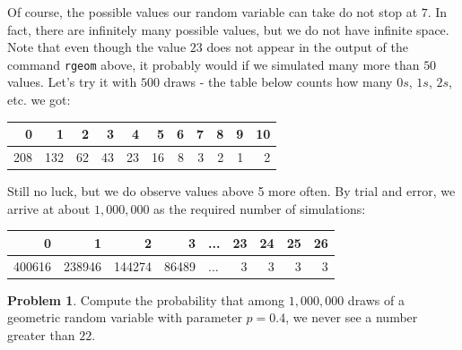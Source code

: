 \documentclass[
]{book}
\theoremstyle{definition}
\theoremstyle{definition}
\theoremstyle{definition}
\newtheorem{exercise}{Problem}[chapter]
\theoremstyle{definition}
\theoremstyle{remark}
\begin{document}
Of course, the possible values our random variable can take do not stop at \(7\).
In fact, there are infinitely many possible values, but we do not have infinite
space. Note that even though the value \(23\) does not appear in the output of the
command \texttt{rgeom} above, it probably would if we simulated many more than \(50\)
values. Let's try it with \(500\) draws - the table below counts how many \(0s\),
\(1s\), \(2s\), etc. we got:

\begin{tabular}{r|r|r|r|r|r|r|r|r|r|r}
\hline
0 & 1 & 2 & 3 & 4 & 5 & 6 & 7 & 8 & 9 & 10\\
\hline
208 & 132 & 62 & 43 & 23 & 16 & 8 & 3 & 2 & 1 & 2\\
\hline
\end{tabular}

Still no luck, but we do observe values above 5 more often. By trial and error,
we arrive at about \(1,000,000\) as the required number of simulations:

\begin{tabular}{r|r|r|r|l|r|r|r|r}
\hline
0 & 1 & 2 & 3 & ... & 23 & 24 & 25 & 26\\
\hline
400616 & 238946 & 144274 & 86489 & ... & 3 & 3 & 3 & 3\\
\hline
\end{tabular}

\begin{exercise}
Compute the probability that among \(1,000,000\) draws of a geometric random
variable with parameter \(p=0.4\), we never see a number greater than \(22\).
\end{exercise}
\end{document}
